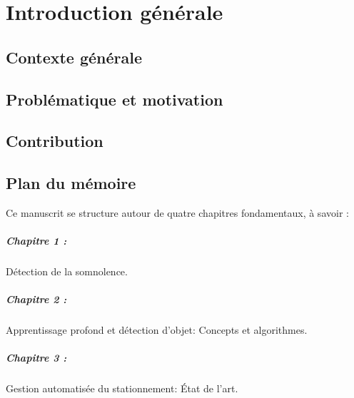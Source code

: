 \chapter*{Introduction générale}
\thispagestyle{plain}

\section*{Contexte générale}



\section*{Problématique et motivation}



\section*{Contribution}



\section*{Plan du mémoire}
Ce manuscrit se structure autour de quatre chapitres fondamentaux, à savoir :

\paragraph{Chapitre 1 :}
Détection de la somnolence.\\
 

\paragraph{Chapitre 2 :}
Apprentissage profond et détection d'objet: Concepts et algorithmes.\\


\paragraph{Chapitre 3 :}
Gestion automatisée du stationnement: État de l'art.\\


